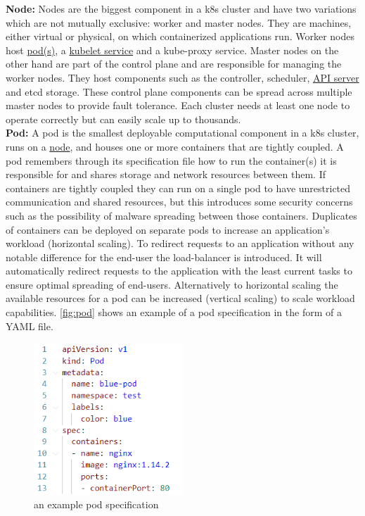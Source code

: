 \textbf{Node:} \label{comp:node} Nodes are the biggest component in a \acrshort{k8s} cluster and have two variations which are not mutually exclusive: worker and master nodes. They are machines, either virtual or physical, on which containerized applications run. Worker nodes host \hyperref[comp:pod]{pod(s)}, a \hyperref[comp:kubelet]{kubelet service} and a kube-proxy service. Master nodes on the other hand are part of the control plane and are responsible for managing the worker nodes. They host components such as the controller, scheduler, \hyperref[comp:apiserver]{API server} and etcd storage. These control plane components can be spread across multiple master nodes to provide fault tolerance. Each cluster needs at least one node to operate correctly but can easily scale up to thousands.  \cite{node}
\\[10pt]

\textbf{Pod:} \label{comp:pod} A pod is the smallest deployable computational component in a \acrshort{k8s} cluster, runs on a \hyperref[comp:node]{node}, and houses one or more containers that are tightly coupled. A pod remembers through its specification file how to run the container(s) it is responsible for and shares storage and network resources between them. If containers are tightly coupled they can run on a single pod to have unrestricted communication and shared resources, but this introduces some security concerns such as the possibility of malware spreading between those containers. Duplicates of containers can be deployed on separate pods to increase an application's workload (horizontal scaling). To redirect requests to an application without any notable difference for the end-user the load-balancer is introduced. It will automatically redirect requests to the application with the least current tasks to ensure optimal spreading of end-users. Alternatively to horizontal scaling the available resources for a pod can be increased (vertical scaling) to scale workload capabilities. \autoref{fig:pod} shows an example of a pod specification in the form of a YAML file. \cite{pod}
\\[10pt]

\begin{figure}[htbp]
  \centering
  \includegraphics[width=0.5\textwidth]{images/pod.png} 
  \caption{an example pod specification}
  \label{fig:pod}
\end{figure}

